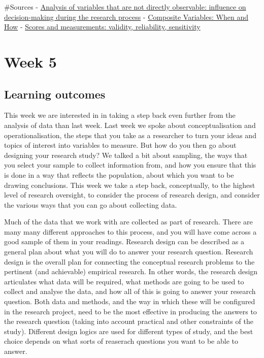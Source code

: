 \documentclass[]{book}
\theoremstyle{definition}
\theoremstyle{definition}
\theoremstyle{definition}
\theoremstyle{remark}
\begin{document}
\#Sources -
\href{http://www.scielo.br/scielo.php?script=sci_arttext\&pid=S0080-62342014000100146}{Analysis
of variables that are not directly observable: influence on
decision-making during the research process} -
\href{https://www.ncbi.nlm.nih.gov/pmc/articles/PMC5459482/}{Composite
Variables: When and How} -
\href{http://onlinelibrary.wiley.com.manchester.idm.oclc.org/doi/10.1002/9780470024522.ch4/pdf}{Scores
and measurements: validity, reliability, sensitivity}

\hypertarget{week5}{%
\chapter{Week 5}\label{week5}}

\hypertarget{learning-outcomes-4}{%
\section{Learning outcomes}\label{learning-outcomes-4}}

This week we are interested in in taking a step back even further from
the analysis of data than last week. Last week we spoke about
conceptualisation and operationalisation, the steps that you take as a
researcher to turn your ideas and topics of interest into variables to
measure. But how do you then go about designing your research study? We
talked a bit about sampling, the ways that you select your sample to
collect information from, and how you ensure that this is done in a way
that reflects the population, about which you want to be drawing
conclusions. This week we take a step back, conceptually, to the highest
level of research oversight, to consider the process of research design,
and consider the various ways that you can go about collecting data.

Much of the data that we work with are collected as part of research.
There are many many different approaches to this process, and you will
have come across a good sample of them in your readings. Research design
can be described as a general plan about what you will do to answer your
research question. Research design is the overall plan for connecting
the conceptual research problems to the pertinent (and achievable)
empirical research. In other words, the research design articulates what
data will be required, what methods are going to be used to collect and
analyse the data, and how all of this is going to answer your research
question. Both data and methods, and the way in which these will be
configured in the research project, need to be the most effective in
producing the answers to the research question (taking into account
practical and other constraints of the study). Different design logics
are used for different types of study, and the best choice depends on
what sorts of reaserach questions you want to be able to answer.
\end{document}
